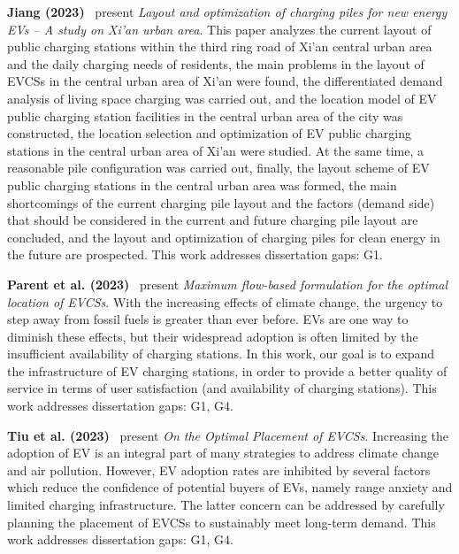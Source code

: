 \documentclass[letterpaper, 12pt, oneside, doublespacing]{Thesis}
\begin{document}
\noindent \textbf{Jiang (2023)}~\cite{layout_and_2023} present \textit{Layout and optimization of charging piles for new energy EVs -- A study on Xi'an urban area}. This paper analyzes the current layout of public charging stations within the third ring road of Xi'an central urban area and the daily charging needs of residents, the main problems in the layout of EVCSs in the central urban area of Xi'an were found, the differentiated demand analysis of living space charging was carried out, and the location model of EV public charging station facilities in the central urban area of the city was constructed, the location selection and optimization of EV public charging stations in the central urban area of Xi'an were studied. At the same time, a reasonable pile configuration was carried out, finally, the layout scheme of EV public charging stations in the central urban area was formed, the main shortcomings of the current charging pile layout and the factors (demand side) that should be considered in the current and future charging pile layout are concluded, and the layout and optimization of charging piles for clean energy in the future are prospected. This work addresses dissertation gaps: G1.



\noindent \textbf{Parent et al. (2023)}~\cite{maximum_flow-based_2023} present \textit{Maximum flow-based formulation for the optimal location of EVCSs}. With the increasing effects of climate change, the urgency to step away from fossil fuels is greater than ever before. EVs are one way to diminish these effects, but their widespread adoption is often limited by the insufficient availability of charging stations. In this work, our goal is to expand the infrastructure of EV charging stations, in order to provide a better quality of service in terms of user satisfaction (and availability of charging stations). This work addresses dissertation gaps: G1, G4.



\noindent \textbf{Tiu et al. (2023)}~\cite{on_the_2023} present \textit{On the Optimal Placement of EVCSs}. Increasing the adoption of EV is an integral part of many strategies to address climate change and air pollution. However, EV adoption rates are inhibited by several factors which reduce the confidence of potential buyers of EVs, namely range anxiety and limited charging infrastructure. The latter concern can be addressed by carefully planning the placement of EVCSs to sustainably meet long-term demand. This work addresses dissertation gaps: G1, G4.
\end{document}

